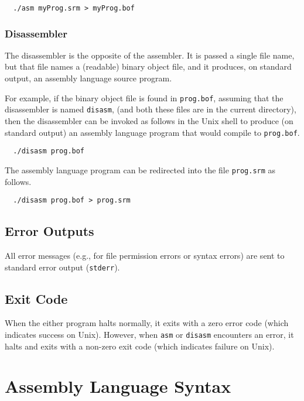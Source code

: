 \documentclass[11pt,letterpaper]{article}
\begin{document}
\begin{lstlisting}
  ./asm myProg.srm > myProg.bof
\end{lstlisting}

\subsubsection{Disassembler}

The disassembler is the opposite of the assembler.
It is passed a single file name, but that file names a (readable) binary object
file, and it produces, on standard output,
an assembly language source program.

For example, if the binary object file is found in \texttt{prog.bof},
assuming that the disassembler is named \texttt{disasm},
(and both these files are in the current directory), then the disassembler
can be invoked as follows in the Unix shell to produce (on standard
output) an assembly language program that would compile to \texttt{prog.bof}.

\begin{lstlisting}
  ./disasm prog.bof
\end{lstlisting}

The assembly language program can be redirected into the file \texttt{prog.srm} as follows.

\begin{lstlisting}
  ./disasm prog.bof > prog.srm
\end{lstlisting}

\subsection{Error Outputs}

All error messages (e.g., for file permission errors or syntax errors) 
are sent to standard error output (\texttt{stderr}).

\subsection{Exit Code}

When the either program halts normally, it exits with a zero error code
(which indicates success on Unix).  However, when \texttt{asm} or
\texttt{disasm} encounters an error,
it halts and exits with a non-zero exit code
(which indicates failure on Unix).

\section{Assembly Language Syntax}
\end{document}
